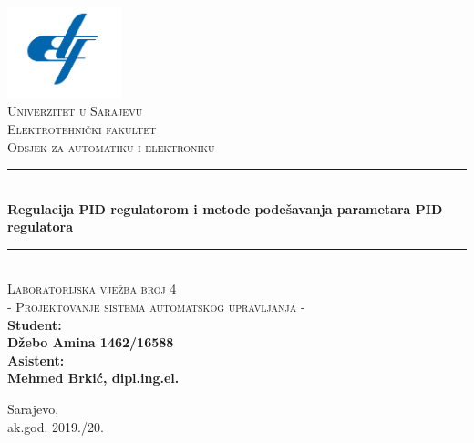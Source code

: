 \documentclass[12pt,oneside, a4paper]{book}
\newcommand{\HRule}{\rule{\linewidth}{0.5mm}}
\begin{document}

\frontmatter

\begin{titlepage}
\begin{center}

\includegraphics[width=0.25\textwidth]{etf-logo.png}~\\[0.1cm]
\textsc{\Large Univerzitet u Sarajevu}\\[0.2cm]  
\textsc{\Large Elektrotehnički fakultet}\\[0.2cm] 
\textsc{\Large Odsjek za automatiku i elektroniku}\\[3cm]\HRule \\[0.5cm] 
{\huge \bfseries Regulacija PID regulatorom i metode podešavanja parametara
PID regulatora} \\[0.4cm] 
\HRule \\[0.5cm]

\textsc{\Large Laboratorijska vježba broj 4}\\[0.4cm]
\textsc{\Large - Projektovanje sistema automatskog upravljanja - }\\[1.5cm]

\textbf{ 
\Large Student:\\[0.2cm]  
\Large Džebo Amina 1462/16588\\ [1cm]
\Large Asistent: \\[0.2cm] 
\Large Mehmed Brkić, dipl.ing.el.\\
} 
\vfill

{\large Sarajevo, \\ak.god. 2019./20.}

\end{center} 
\end{titlepage}


\tableofcontents
\listoffigures
{}
\end{document}
